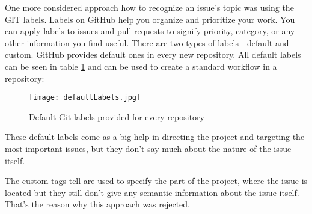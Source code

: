 One more considered approach how to recognize an issue's topic was using the GIT labels. Labels on GitHub help you organize and prioritize your work. You can apply labels to issues and pull requests to signify priority, category, or any other information you find useful. There are two types of labels - default and custom. GitHub provides default ones in every new repository. All default labels can be seen in table \ref{fig:defaultLabels} and can be used to create a standard workflow in a repository:

\begin{figure}[H]%
    \centering
	\texttt{[image: defaultLabels.jpg]}
    \caption{Default Git labels provided for every repository}%
    \label{fig:defaultLabels}%
\end{figure}

These default labels come as a big help in directing the project and targeting the most important issues, but they don't say much about the nature of the issue itself.

The custom tags tell are used to specify the part of the project, where the issue is located but they still don't give any semantic information about the issue itself. That's the reason why this approach was rejected. 
